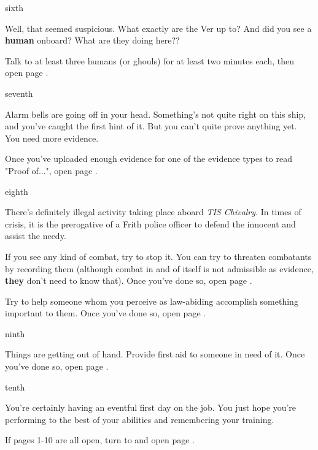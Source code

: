 \documentclass[greennotebook]{guildcamp4} %
\begin{document}
\begin{page}{sixth}

Well, that seemed suspicious. What exactly are the Ver up to? And did you see a {\bf human} onboard? What are they doing here??

Talk to at least three humans (or ghouls) for at least two minutes each, then open page .

\end{page}

\begin{page}{seventh}

Alarm bells are going off in your head. Something's not quite right on this ship, and you've caught the first hint of it. But you can't quite prove anything yet. You need more evidence.

Once you've uploaded enough evidence for one of the evidence types to read "Proof of...", open page .

\end{page}

\begin{page}{eighth}

There's definitely illegal activity taking place aboard \emph {TIS Chivalry}. In times of crisis, it is the prerogative of a Frith police officer to defend the innocent and assist the needy.

If you see any kind of combat, try to stop it. You can try to threaten combatants by recording them (although combat in and of itself is not admissible as evidence, {\bf they} don't need to know that). Once you've done so, open page .

Try to help someone whom you perceive as law-abiding accomplish something important to them. Once you've done so, open page .

\end{page}

\begin{page}{ninth}

Things are getting out of hand. Provide first aid to someone in need of it. Once you've done so, open page .

\end{page}

\begin{page}{tenth}

You're certainly having an eventful first day on the job. You just hope you're performing to the best of your abilities and remembering your training.

If pages 1-10 are all open, turn to and open page .

\end{page}
\end{document}
